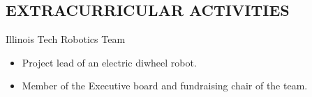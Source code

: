 \documentclass{res}
\begin{document}
\begin{resume}
 
 
\section{EXTRACURRICULAR ACTIVITIES}          
    Illinois Tech Robotics Team
    \begin{itemize}
       \item Project lead of an electric diwheel robot.
       \item Member of the Executive board and fundraising chair of the team.
    \end{itemize}
\end{resume}
\end{document}
